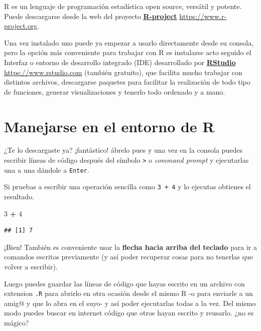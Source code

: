 \documentclass[]{book}
\newenvironment{Shaded}{\begin{snugshade}}{\end{snugshade}}
\newcommand{\DecValTok}[1]{\textcolor[rgb]{0.00,0.00,0.81}{#1}}
\newcommand{\OperatorTok}[1]{\textcolor[rgb]{0.81,0.36,0.00}{\textbf{#1}}}
\newcommand{\StringTok}[1]{\textcolor[rgb]{0.31,0.60,0.02}{#1}}
\theoremstyle{definition}
\theoremstyle{definition}
\theoremstyle{definition}
\theoremstyle{remark}
\begin{document}
R \citep{R-r} es un lenguaje de programación estadística open source,
versátil y potente. Puede descargarse desde la web del proyecto
\href{https://www.r-project.org}{\textbf{R-project}}
\url{https://www.r-project.org}.

Una vez instalado uno puede ya empezar a usarlo directamente desde su
consola, pero la opción más conveniente para trabajar con R es
instalarse acto seguido el Interfaz o entorno de desarrollo integrado
(IDE) desarrollado por \href{https://www.rstudio.com}{\textbf{RStudio}}
\url{https://www.rstudio.com} (también gratuito), que facilita mucho
trabajar con distintos archivos, descargarse paquetes para facilitar la
realización de todo tipo de funciones, generar visualizaciones y tenerlo
todo ordenado y a mano.

\hypertarget{manejarse-en-el-entorno-de-r}{%
\section{Manejarse en el entorno de
R}\label{manejarse-en-el-entorno-de-r}}

¿Te lo descargaste ya? ¡fantástico! ábrelo pues y una vez en la consola
puedes escribir líneas de código después del símbolo
\texttt{\textgreater{}} o \emph{command prompt} y ejecutarlas una a una
dándole a \texttt{Enter}.

Si pruebas a escribir una operación sencilla como \texttt{3\ +\ 4} y lo
ejecutas obtienes el resultado.

\begin{Shaded}
\begin{Highlighting}[]
\DecValTok{3} \OperatorTok{+}\StringTok{ }\DecValTok{4}
\end{Highlighting}
\end{Shaded}

\begin{verbatim}
## [1] 7
\end{verbatim}

¡Bien! También es conveniente usar la \textbf{flecha hacia arriba del
teclado} para ir a comandos escritos previamente (y así poder recuperar
cosas para no tenerlas que volver a escribir).

Luego puedes guardar las líneas de código que hayas escrito en un
archivo con extension \texttt{.R} para abrirlo en otra ocasión desde el
mismo R -o para enviarle a un amig@ y que lo abra en el suyo- y así
poder ejecutarlas todas a la vez. Del mismo modo puedes buscar en
internet código que otros hayan escrito y reusarlo. ¿no es mágico?
\end{document}
